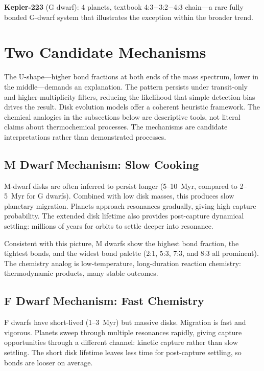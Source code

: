 \documentclass[twocolumn]{aastex631}
\begin{document}
\textbf{Kepler-223} (G dwarf): 4 planets, textbook 4:3$-$3:2$-$4:3 chain---a
rare fully bonded G-dwarf system that illustrates the exception within the
broader trend.

\section{Two Candidate Mechanisms}
\label{sec:mechanisms}

The U-shape---higher bond fractions at both ends of the mass spectrum, lower
in the middle---demands an explanation. The pattern persists under
transit-only and higher-multiplicity filters, reducing
the likelihood that simple detection bias drives the result.
Disk evolution models offer a coherent heuristic framework. The chemical
analogies in the subsections below are descriptive tools, not literal claims
about thermochemical processes. The mechanisms are candidate interpretations
rather than demonstrated processes.

\subsection{M Dwarf Mechanism: Slow Cooking}

M-dwarf disks are often inferred to persist longer (5--10~Myr, compared to
2--5~Myr for G dwarfs)\citep{yasui2010,haisch2001}. Combined with low disk
masses, this produces slow planetary migration. Planets approach resonances
gradually, giving high capture probability. The extended disk lifetime also
provides post-capture dynamical settling: millions of years for orbits to settle
deeper into resonance.

Consistent with this picture, M dwarfs show the highest bond fraction, the
tightest bonds, and the widest bond palette (2:1, 5:3, 7:3, and 8:3 all
prominent). The chemistry analog is low-temperature, long-duration reaction
chemistry: thermodynamic products, many stable outcomes.

\subsection{F Dwarf Mechanism: Fast Chemistry}

F dwarfs have short-lived (1--3~Myr) but massive disks\citep{sicilia_aguilar}.
Migration is fast and vigorous. Planets sweep through multiple resonances
rapidly, giving capture opportunities through a different channel: kinetic
capture rather than slow settling. The short disk lifetime leaves less time for
post-capture settling, so bonds are looser on average.
\end{document}
